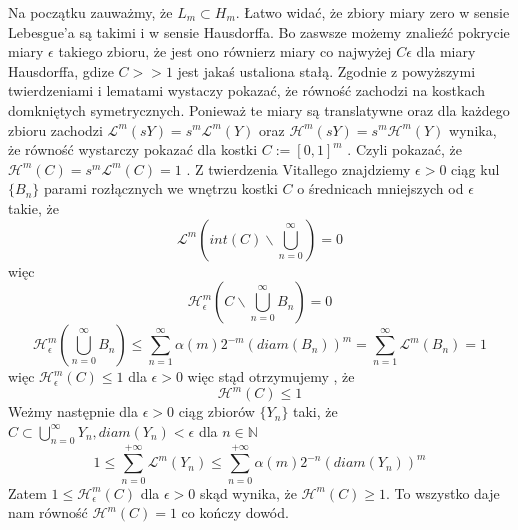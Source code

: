 Na początku zauważmy, że $L_m \subset H_m$. Łatwo widać, że zbiory miary zero w sensie Lebesgue'a są takimi i w sensie Hausdorffa. Bo zaswsze możemy znalieźć pokrycie miary $\epsilon$ takiego zbioru, że jest ono równierz miary co najwyżej $C \epsilon$ dla miary Hausdorffa, gdize $C >> 1$ jest jakaś ustaliona stałą. Zgodnie z powyższymi twierdzeniami i lematami wystaczy pokazać, że równość zachodzi na kostkach domkniętych symetrycznych. Ponieważ te miary są translatywne oraz dla każdego zbioru zachodzi $\mathcal{L}^m(sY) = s^m\mathcal{L}^m(Y)$ oraz  $\mathcal{H}^m(sY) = s^m\mathcal{H}^m(Y)$  wynika, że równość wystarczy pokazać dla kostki $C:= [0,1]^m$ . Czyli pokazać, że $\mathcal{H}^m(C) = s^m\mathcal{L}^m(C) = 1$ . Z twierdzenia Vitallego znajdziemy $\epsilon > 0$ ciąg kul $\{B_n\}$ parami rozłącznych we wnętrzu kostki $C$ o średnicach mniejszych od $\epsilon$ takie, że $$ \mathcal{L}^m(int(C) \backslash \bigcup_{n=0}^{\infty}) = 0 $$ więc $$ \mathcal{H}^m_{\epsilon}(C \backslash \bigcup_{n=0}^{\infty} B_n) = 0 $$ $$ \mathcal{H}^m_{\epsilon}(\bigcup_{n=0}^{\infty} B_n) \leq \sum_{n=1}^{\infty} \alpha(m)2^{-m}(diam(B_n))^m = \sum_{n=1}^{\infty} \mathcal{L}^m(B_n) = 1$$ więc $\mathcal{H}^m_{\epsilon}(C) \leq 1$ dla $\epsilon > 0$ więc stąd otrzymujemy , że $$\mathcal{H}^m(C) \leq 1 $$ Weżmy następnie dla $\epsilon >0 $ ciąg zbiorów $\{Y_n\}$ taki, że $C \subset \bigcup_{n=0}^{\infty} Y_n, diam(Y_n) < \epsilon$ dla $n \in \mathbb{N}$ $$ 1 \leq \sum_{n=0}^{+\infty} \mathcal{L}^m(Y_n) \leq \sum_{n=0}^{+\infty} \alpha(m)2^{-n}(diam(Y_n))^m $$ Zatem $1 \leq \mathcal{H}^m_{\epsilon}(C)$ dla $\epsilon > 0$ skąd wynika, że $\mathcal{H}^m(C) \geq 1$. To wszystko daje nam równość $\mathcal{H}^m(C) = 1$ co kończy dowód.
